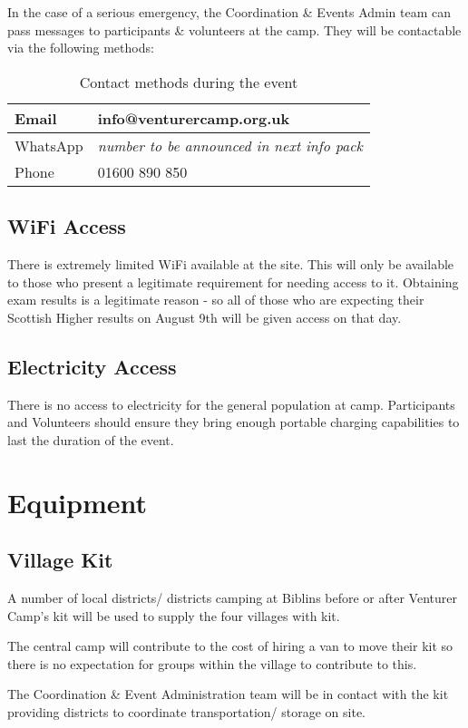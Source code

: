 \documentclass[a4paper, 11pt]{report}
\newcommand{\nl}{\newline}
\begin{document}
In the case of a serious emergency, the Coordination \& Events Admin team can pass messages to participants \& volunteers at the camp. They will be contactable via the following methods:
\begin{table}[H]
    \centering
    \begin{tabular}{p{} p{}}
        \hline
        Email & info@venturercamp.org.uk\\
        \hline
        WhatsApp & \textit{number to be announced in next info pack}\\
        \hline
        Phone & 01600 890 850\\
        \hline
    \end{tabular}
    \caption{Contact methods during the event}
\end{table}

\section{WiFi Access}
There is extremely limited WiFi available at the site. This will only be available to those who present a legitimate requirement for needing access to it. Obtaining exam results is a legitimate reason - so all of those who are expecting their Scottish Higher results on August 9th will be given access on that day.

\section{Electricity Access}
There is no access to electricity for the general population at camp. Participants and Volunteers should ensure they bring enough portable charging capabilities to last the duration of the event.

\chapter{Equipment}
\section{Village Kit}
A number of local districts/ districts camping at Biblins before or after Venturer Camp's kit will be used to supply the four villages with kit.\nl

The central camp will contribute to the cost of hiring a van to move their kit so there is no expectation for groups within the village to contribute to this.\nl

The Coordination \& Event Administration team will be in contact with the kit providing districts to coordinate transportation/ storage on site.
\end{document}
